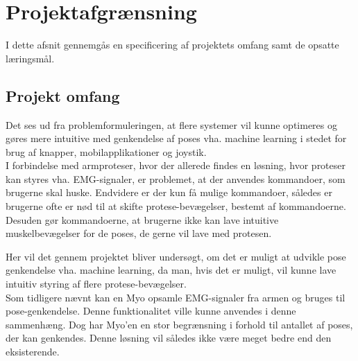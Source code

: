 \thispagestyle{fancy}
\chapter{Projektafgrænsning}
\label{chp:projektafgraensning}
I dette afsnit gennemgås en specificering af projektets omfang samt de opsatte læringsmål. 
\section{Projekt omfang}
Det ses ud fra problemformuleringen, at flere systemer vil kunne optimeres og gøres mere intuitive med genkendelse af poses vha. machine learning i stedet for brug af knapper, mobilapplikationer og joystik. \\

I forbindelse med armproteser, hvor der allerede findes en løsning, hvor proteser kan styres vha. EMG-signaler, er problemet, at der anvendes kommandoer, som brugerne skal huske. Endvidere er der kun få mulige kommandoer, således er brugerne ofte er nød til at skifte protese-bevægelser, bestemt af kommandoerne. Desuden gør kommandoerne, at brugerne ikke kan lave intuitive muskelbevægelser for de poses, de gerne vil lave med protesen. 

Her vil det gennem projektet bliver undersøgt, om det er muligt at udvikle pose genkendelse vha. machine learning, da man, hvis det er muligt, vil kunne lave intuitiv styring af flere protese-bevægelser. \\
Som tidligere nævnt kan en Myo opsamle EMG-signaler fra armen og bruges til pose-genkendelse. Denne funktionalitet ville kunne anvendes i denne sammenhæng. Dog har Myo'en en stor begrænsning i forhold til antallet af poses, der kan genkendes. Denne løsning vil således ikke være meget bedre end den eksisterende.\\

